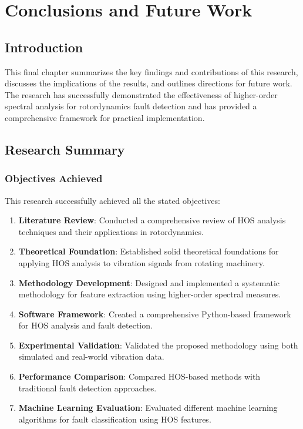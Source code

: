 
\chapter{Conclusions and Future Work}

\section{Introduction}

This final chapter summarizes the key findings and contributions of this research, discusses the implications of the results, and outlines directions for future work. The research has successfully demonstrated the effectiveness of higher-order spectral analysis for rotordynamics fault detection and has provided a comprehensive framework for practical implementation.

\section{Research Summary}

\subsection{Objectives Achieved}

This research successfully achieved all the stated objectives:

\begin{enumerate}
    \item \textbf{Literature Review}: Conducted a comprehensive review of HOS analysis techniques and their applications in rotordynamics.
    \item \textbf{Theoretical Foundation}: Established solid theoretical foundations for applying HOS analysis to vibration signals from rotating machinery.
    \item \textbf{Methodology Development}: Designed and implemented a systematic methodology for feature extraction using higher-order spectral measures.
    \item \textbf{Software Framework}: Created a comprehensive Python-based framework for HOS analysis and fault detection.
    \item \textbf{Experimental Validation}: Validated the proposed methodology using both simulated and real-world vibration data.
    \item \textbf{Performance Comparison}: Compared HOS-based methods with traditional fault detection approaches.
    \item \textbf{Machine Learning Evaluation}: Evaluated different machine learning algorithms for fault classification using HOS features.
\end{enumerate}

